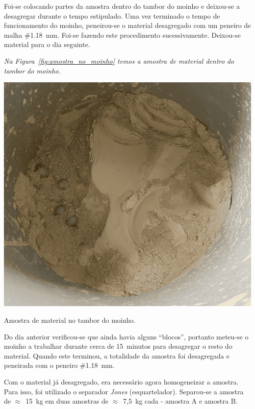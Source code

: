 Foi-se colocando partes da amostra dentro do tambor do moinho e deixou-se a desagregar durante o tempo estipulado.
Uma vez terminado o tempo de funcionamento do moinho, peneirou-se o material desagregado com um peneiro de malha \#1.18~mm.
Foi-se fazendo este procedimento sucessivamente.
Deixou-se material para o dia seguinte.

\hrulefill



\textit{Na Figura~\ref{fig:amostra_no_moinho} temos a amostra de material dentro do tambor do moinho.}

\begin{marginfigure}
    \includegraphics[width=\linewidth]{figures/amostra_no_moinho}
    \caption{Amostra de material no tambor do moinho.}
    \label{fig:amostra_no_moinho}
\end{marginfigure}

Do dia anterior verificou-se que ainda havia alguns ``blocos'', portanto meteu-se o moinho a trabalhar durante cerca de 15~minutos para desagregar o resto do material.
Quando este terminou, a totalidade da amostra foi desagregada e peneirada com o peneiro \#1.18~mm.

Com o material já desagregado, era necessário agora homogeneizar a amostra.
Para isso, foi utilizado o separador \emph{Jones} (esquartelador).
Separou-se a amostra de $\approx$~15~kg em duas amostras de $\approx$~7,5~kg cada - amostra A e amostra B\@.

